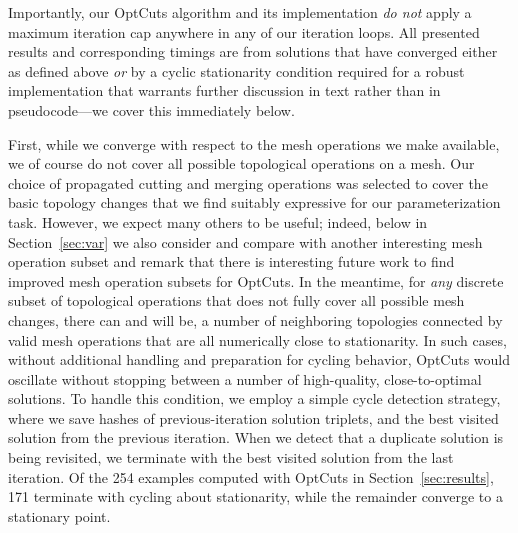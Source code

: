 
Importantly, our OptCuts algorithm and its implementation \emph{do not} apply a maximum iteration cap anywhere in any of our iteration loops. All presented results and corresponding timings are from solutions that have converged either as defined above \emph{or} by a cyclic stationarity condition required for a robust implementation that warrants further discussion in text rather than in pseudocode---we cover this immediately below.

First, while we converge with respect to the mesh operations we make available, we of course do not cover all possible topological operations on a mesh. Our choice of propagated cutting and merging operations was selected to cover the basic topology changes that we find suitably expressive for our parameterization task. However, we expect many others to be useful; indeed, below in Section~\ref{sec:var} we also consider and compare with another interesting mesh operation subset and remark that there is interesting future work to find improved mesh operation subsets for OptCuts. In the meantime, for \emph{any} discrete subset of topological operations that does not fully cover all possible mesh changes, there can and will be, a number of neighboring topologies connected by valid mesh operations that are all numerically close to stationarity. In such cases, without additional handling and preparation for cycling behavior, OptCuts would oscillate without stopping between a number of high-quality, close-to-optimal solutions. To handle this condition, we employ a simple cycle detection strategy, where we save hashes of previous-iteration solution triplets, and the best visited solution from the previous iteration. When we detect that a duplicate solution is being revisited, we terminate with the best visited solution from the last iteration. Of the 254 examples computed with OptCuts in Section~\ref{sec:results}, 171 terminate with cycling about stationarity, while the remainder converge to a stationary point. 

